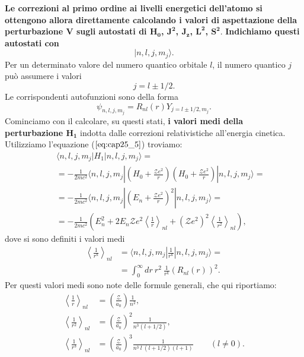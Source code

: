 \documentclass[a4paper,12pt,oneside]{book}
\begin{document}
\textbf{Le correzioni al primo ordine ai livelli energetici dell'atomo si ottengono allora direttamente calcolando i valori di aspettazione della perturbazione $\boldsymbol{V}$ sugli autostati di $\boldsymbol{H_0}$, $\boldsymbol{J^2}$, $\boldsymbol{J_z}$, $\boldsymbol{L^2}$, $\boldsymbol{S^2}$}. \textbf{Indichiamo questi autostati con}
\begin{equation} 
| n,l,j,m_j \rangle .
\end{equation}
Per un determinato valore del numero quantico orbitale $l$, il numero quantico $j$ può assumere i valori
\begin{equation} 
j=l\pm1/2 .
\end{equation}
Le corrispondenti autofunzioni sono della forma
\begin{equation} 
\psi_{n,l,j,m_j}=R_{nl}(r)Y_{j=l\pm1/2,m_j} .
\end{equation}
Cominciamo con il calcolare, su questi stati, \textbf{i valori medi della perturbazione $\boldsymbol{H_1}$} indotta dalle correzioni relativistiche all'energia cinetica. Utilizziamo l'equazione ($\ref{eq:cap25_5}$) troviamo:
\begin{eqnarray} \label{eq:cap25_7} 
& &\langle n,l,j,m_j | H_1 |n,l,j,m_j \rangle = \nonumber \\
& &=-\frac{1}{2mc^2}\langle n,l,j,m_j |\left( H_0+\frac{\mathcal{Z}e^2}{r} \right) \left( H_0+\frac{\mathcal{Z}e^2}{r} \right)  |n,l,j,m_j \rangle = \nonumber \\
& &=-\frac{1}{2mc^2}\langle n,l,j,m_j | \left( E_n+\frac{\mathcal{Z}e^2}{r} \right)^2  | n,l,j,m_j\rangle = \nonumber \\
& &=-\frac{1}{2mc^2} \left( E_n^2+2E_n\mathcal{Z}e^2 \left< \frac{1}{r} \right>_{nl} +\left( \mathcal{Z}e^2 \right)^2\left< \frac{1}{r^2} \right>_{nl} \right)  ,
\end{eqnarray}
dove si sono definiti i valori medi
\begin{eqnarray} 
\left< \frac{1}{r^k} \right>_{nl} & = \langle n,l,j,m_j | \frac{1}{r^k} | n,l,j,m_j \rangle = \nonumber\\
& = \int_0^{\infty} dr \ r^2 \ \frac{1}{r^k} \left( R_{nl}(r) \right)^2 .
\end{eqnarray}
Per questi valori medi sono note delle formule generali, che qui riportiamo:
\begin{equation} \label{eq:cap25_8}
\begin{split}
\left< \frac{1}{r} \right>_{nl} & = \left( \frac{\mathcal{Z}}{a_0} \right) \frac{1}{n^2} , \\ 
\left< \frac{1}{r^2} \right>_{nl} & = \left( \frac{\mathcal{Z}}{a_0} \right)^2 \frac{1}{n^3(l+1/2)}  ,\\ 
\left< \frac{1}{r^3} \right>_{nl} &= \left( \frac{\mathcal{Z}}{a_0} \right)^3 \frac{1}{n^3 \ l \ (l+1/2)(l+1)} \qquad (l \neq0) .
\end{split}
\end{equation}
\end{document}

